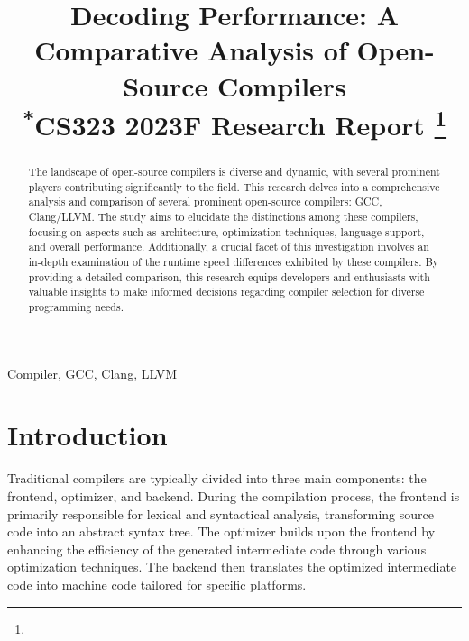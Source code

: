 \documentclass[conference]{IEEEtran}
\begin{document}
\title{Decoding Performance: A Comparative Analysis of Open-Source Compilers\\
{\footnotesize \textsuperscript{*}CS323 2023F Research Report}
\thanks{}
}

\author{
\and
{}
\and
{}
}
\maketitle

\begin{abstract}
The landscape of open-source compilers is diverse and dynamic, with several prominent players contributing significantly to the field. This research delves into a comprehensive analysis and comparison of several prominent open-source compilers: GCC, Clang/LLVM. The study aims to elucidate the distinctions among these compilers, focusing on aspects such as architecture, optimization techniques, language support, and overall performance. Additionally, a crucial facet of this investigation involves an in-depth examination of the runtime speed differences exhibited by these compilers. By providing a detailed comparison, this research equips developers and enthusiasts with valuable insights to make informed decisions regarding compiler selection for diverse programming needs.
\end{abstract}

\begin{IEEEkeywords}
Compiler, GCC, Clang, LLVM
\end{IEEEkeywords}

\section{Introduction}
Traditional compilers are typically divided into three main components: the frontend, optimizer, and backend. During the compilation process, the frontend is primarily responsible for lexical and syntactical analysis, transforming source code into an abstract syntax tree. The optimizer builds upon the frontend by enhancing the efficiency of the generated intermediate code through various optimization techniques. The backend then translates the optimized intermediate code into machine code tailored for specific platforms.
\end{document}
